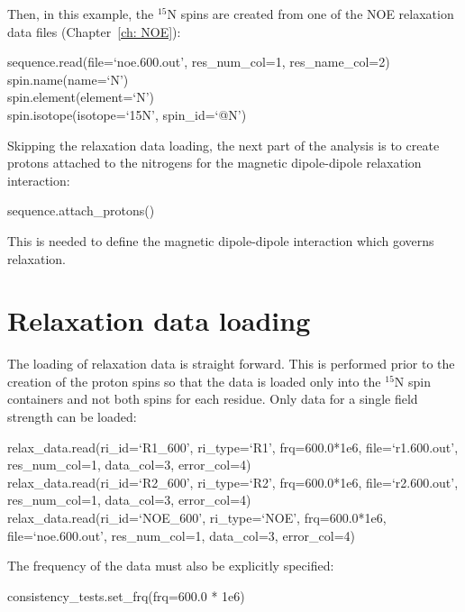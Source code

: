 Then, in this example, the $^{15}$N spins are created from one of the NOE relaxation data files (Chapter~\ref{ch: NOE}):

\begin{exampleenv}
sequence.read(file=`noe.600.out', res\_num\_col=1, res\_name\_col=2) \\
spin.name(name=`N') \\
spin.element(element=`N') \\
spin.isotope(isotope=`15N', spin\_id=`@N')
\end{exampleenv}

Skipping the relaxation data loading, the next part of the analysis is to create protons attached to the nitrogens for the magnetic dipole-dipole relaxation interaction:

\begin{exampleenv}
sequence.attach\_protons()
\end{exampleenv}

This is needed to define the magnetic dipole-dipole interaction which governs relaxation.




\section{Relaxation data loading}

The loading of relaxation data is straight forward.  This is performed prior to the creation of the proton spins so that the data is loaded only into the $^{15}$N spin containers and not both spins for each residue.  Only data for a single field strength can be loaded:

\begin{exampleenv}
relax\_data.read(ri\_id=`R1\_600',  ri\_type=`R1',  frq=600.0*1e6, file=`r1.600.out', res\_num\_col=1, data\_col=3, error\_col=4) \\
relax\_data.read(ri\_id=`R2\_600',  ri\_type=`R2',  frq=600.0*1e6, file=`r2.600.out', res\_num\_col=1, data\_col=3, error\_col=4) \\
relax\_data.read(ri\_id=`NOE\_600', ri\_type=`NOE', frq=600.0*1e6, file=`noe.600.out', res\_num\_col=1, data\_col=3, error\_col=4)
\end{exampleenv}

The frequency of the data must also be explicitly specified:

\begin{exampleenv}
consistency\_tests.set\_frq(frq=600.0 * 1e6) \\
\end{exampleenv}



